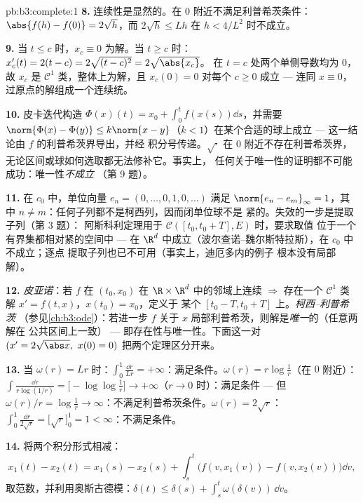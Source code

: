 \begin{solution}{pb:b3:complete:1}
\textbf{8.} 连续性是显然的。在 $0$ 附近不满足利普希茨条件：
$\abs{f(h) - f(0)} = 2\sqrt h$，而 $2\sqrt h \leq L h$
在 $h < 4/L^2$ 时不成立。

\textbf{9.} 当 $t \leq c$ 时，$x_c \equiv 0$ 为解。当 $t \geq
c$ 时：$x_c'(t) = 2(t - c) = 2\sqrt{(t-c)^2} = 2\sqrt{\abs{x_c}}$。
在 $t = c$ 处两个单侧导数均为 $0$，故 $x_c$
是 $\mathcal C^1$ 类，整体上为解，且 $x_c(0) = 0$ 对每个
$c \geq 0$ 成立 --- 连同 $x \equiv 0$，
过原点的解组成一个连续统。

\textbf{10.} 皮卡迭代构造 $\Phi(x)(t) = x_0 +
\int_0^t f(x(s))\dd s$，并需要 $\norm{\Phi(x) - \Phi(y)}
\leq k\norm{x - y}$（$k < 1$）在某个合适的球上成立 ---
这一结论由 $f$ 的利普希茨界导出，并经
积分号传递。$\sqrt\cdot$ 在 $0$ 附近不存在利普希茨界，
无论区间或球如何选取都无法修补它。事实上，
任何关于唯一性的证明都不可能成功：唯一性\emph{不成立}
（第 9 题）。

\textbf{11.} 在 $c_0$ 中，单位向量 $e_n = (0, \dots, 0, 1,
0, \dots)$ 满足 $\norm{e_n - e_m}_\infty = 1$，其中 $n \neq
m$：任何子列都不是柯西列，因而闭单位球不是
紧的。失效的一步是提取子列（第 3 题）：
阿斯科利定理用于 $\mathcal C([t_0, t_0+T], E)$ 时，要求取值
位于一个有界集都相对紧的空间中 ---
在 $\R^d$ 中成立（波尔查诺--魏尔斯特拉斯），在 $c_0$ 中不成立；逐点
提取子列也已不可用（事实上，迪厄多内的例子
根本没有局部解）。

\textbf{12.} \emph{皮亚诺}：若 $f$ 在
$(t_0, x_0)$ 在 $\R\times\R^d$ 中的邻域上连续 $\Rightarrow$ 存在一个
$\mathcal C^1$ 类解 $x' = f(t,x)$，$x(t_0) = x_0$，定义于
某个 $[t_0 - T, t_0 + T]$ 上。\emph{柯西--利普希茨}
（参见\cref{ch:b3:ode}）：若进一步 $f$ 关于
$x$ 局部利普希茨，则解是\emph{唯一}的（任意两解在
公共区间上一致） --- 即存在性与唯一性。下面这一对
$(x' = 2\sqrt{\abs x},\ x(0) = 0)$ 把两个定理区分开来。

\textbf{13.} 当 $\omega(r) = Lr$ 时：$\int_0^1\frac{\dd r}{Lr} =
+\infty$：满足条件。$\omega(r) = r\log\frac1r$（在 $0$ 附近）：
$\int\frac{\dd r}{r\log(1/r)} = \bigl[-\log\log\frac1r\bigr]
\to +\infty$（$r \to 0$ 时）：满足条件 --- 但 $\omega(r)/r =
\log\frac1r \to \infty$：不满足利普希茨条件。$\omega(r) = 2\sqrt
r$：$\int_0^1\frac{\dd r}{2\sqrt r} = \bigl[\sqrt r\bigr]_0^1
= 1 < \infty$：不满足条件。

\textbf{14.} 将两个积分形式相减：
\[
x_1(t) - x_2(t) = x_1(s) - x_2(s) + \int_s^t\bigl(f(v,
x_1(v)) - f(v, x_2(v))\bigr)\dd v,
\]
取范数，并利用奥斯古德模：$\delta(t) \leq
\delta(s) + \int_s^t\omega(\delta(v))\,\dd v$。


\end{solution}
